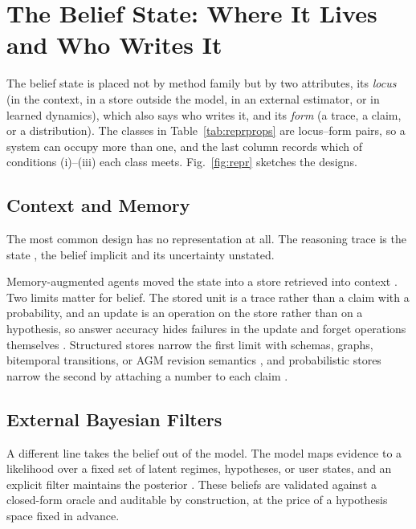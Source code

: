 \section{The Belief State: Where It Lives and Who Writes It}
\label{sec:representation}




The belief state is placed not by method family but by two attributes, its \emph{locus} (in the context, in a store outside the model, in an external estimator, or in learned dynamics), which also says who writes it, and its \emph{form} (a trace, a claim, or a distribution). The classes in Table~\ref{tab:reprprops} are locus--form pairs, so a system can occupy more than one, and the last column records which of conditions (i)--(iii) each class meets. Fig.~\ref{fig:repr} sketches the designs.

\subsection{Context and Memory}
\label{sec:repr:memory}

The most common design has no representation at all. The reasoning trace is the state \citep{wei2022chain,yao2023react}, the belief implicit and its uncertainty unstated.

Memory-augmented agents moved the state into a store retrieved into context \citep{packer2023memgpt,park2023generative,zhong2024memorybank,xu2025amem,luo2026storage,jiang2026jevmem}. Two limits matter for belief. The stored unit is a trace rather than a claim with a probability, and an update is an operation on the store rather than on a hypothesis, so answer accuracy hides failures in the update and forget operations themselves \citep{hao2026memops}. Structured stores narrow the first limit with schemas, graphs, bitemporal transitions, or AGM revision semantics \citep{luo2026graph,xu2026governed,park2026graph}, and probabilistic stores narrow the second by attaching a number to each claim \citep{liao2026belief,song2026d,yang2026belief,zhang2026toward}.

\subsection{External Bayesian Filters}
\label{sec:repr:filter}

A different line takes the belief out of the model. The model maps evidence to a likelihood over a fixed set of latent regimes, hypotheses, or user states, and an explicit filter maintains the posterior \citep{chattopadhayay2026belief,dixon2026belief,wu2026bayesevolve,soru2026semantic,akbar2026bayesian,azran2026bridging,ansell2026clueing}. These beliefs are validated against a closed-form oracle and auditable by construction, at the price of a hypothesis space fixed in advance.

